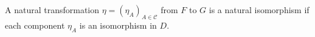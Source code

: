 A natural transformation $\eta = (\eta_A)_{A \in \mathcal{C}}$ from $F$ to $G$ is a natural isomorphism if each component $\eta_A$ is an isomorphism in $D$.
